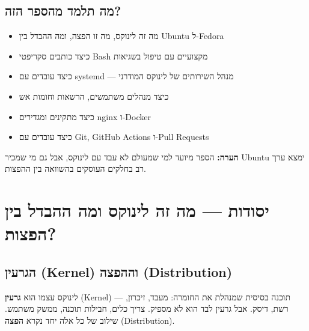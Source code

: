 \documentclass[12pt,a4paper]{article}
\begin{document}
\subsection*{מה תלמד מהספר הזה?}

\begin{itemize}[noitemsep]
  \item מה זה לינוקס, מה זו הפצה, ומה ההבדל בין Ubuntu ל-Fedora
  \item כיצד כותבים סקריפטי Bash מקצועיים עם טיפול בשגיאות
  \item כיצד עובדים עם systemd — מנהל השירותים של לינוקס המודרני
  \item כיצד מנהלים משתמשים, הרשאות וחומות אש
  \item כיצד מתקינים ומגדירים nginx ו-Docker
  \item כיצד עובדים עם Git, GitHub Actions ו-Pull Requests
\end{itemize}

\begin{infobox}
\textbf{הערה:} הספר מיועד למי שמעולם לא עבד עם לינוקס, אבל גם מי שמכיר Ubuntu ימצא ערך רב בחלקים העוסקים בהשוואה בין ההפצות.
\end{infobox}

\newpage
\section{יסודות — מה זה לינוקס ומה ההבדל בין הפצות?}

\subsection{הגרעין (Kernel) וההפצה (Distribution)}

לינוקס עצמו הוא \textbf{גרעין} (Kernel) — תוכנה בסיסית שמנהלת את החומרה: מעבד, זיכרון, רשת, דיסק. אבל גרעין לבד הוא לא מספיק. צריך כלים, חבילות תוכנה, ממשק משתמש. שילוב של כל אלה יחד נקרא \textbf{הפצה} (Distribution).

\begin{center}
\end{center}
\end{document}
